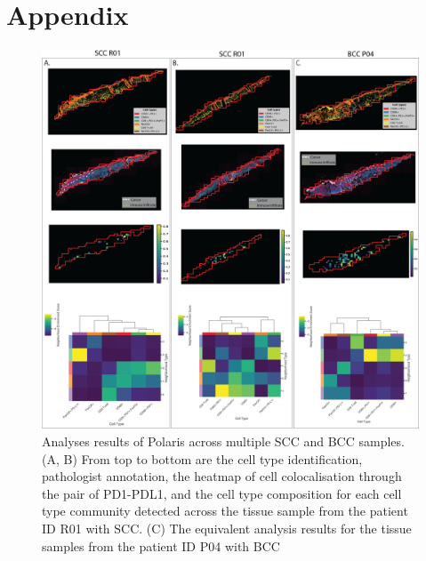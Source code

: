 \section{Appendix}
\begin{figure}[htp]
\renewcommand{\figurename}{Figure}
    \centering
    \includegraphics[width=1.0\columnwidth]{Chapter3/Figures/Chap3_supple_figure_1.png}
     \caption[Analyses results of Polaris across multiple SCC and BCC samples]{Analyses results of Polaris across multiple SCC and BCC samples. (A, B) From top to bottom are the cell type identification, pathologist annotation, the heatmap of cell colocalisation through the pair of PD1-PDL1, and the cell type composition for each cell type community detected across the tissue sample from the patient ID R01 with SCC. (C) The equivalent analysis results for the tissue samples from the patient ID P04 with BCC}
    \label{fig:Chap3_figure6}
\end{figure}

